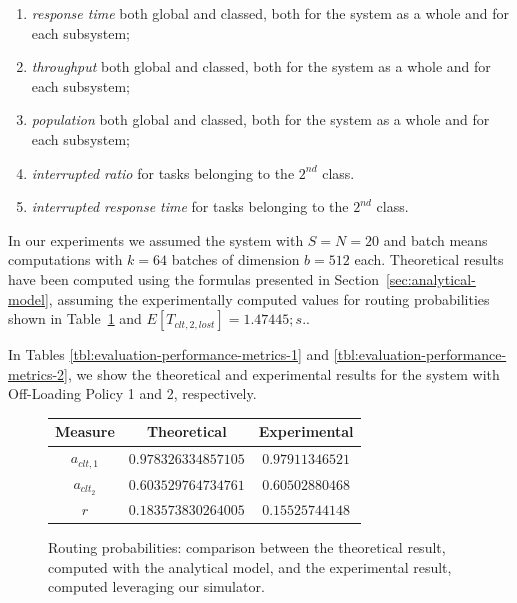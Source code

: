 \begin{enumerate}
	\item \textit{response time} both global and classed, both for the system as a whole and for each subsystem;
	
	\item \textit{throughput} both global and classed, both for the system as a whole and for each subsystem;
	
	\item \textit{population} both global and classed, both for the system as a whole and for each subsystem;
	
	\item \textit{interrupted ratio} for tasks belonging to the $2^{nd}$ class.
	
	\item \textit{interrupted response time} for tasks belonging to the $2^{nd}$ class.
\end{enumerate}

In our experiments we assumed the system with $S=N=20$ and batch means computations with $k=64$ batches of dimension $b=512$ each.
%
Theoretical results have been computed using the formulas presented in Section~\ref{sec:analytical-model}, assuming the experimentally computed values for routing probabilities shown in Table~\ref{tbl:evaluation-routing-probabilities} and $E[T_{clt,2,lost}]=1.47445;s.$.

In Tables \ref{tbl:evaluation-performance-metrics-1} and \ref{tbl:evaluation-performance-metrics-2}, we show the theoretical and experimental results for the system with Off-Loading Policy 1 and 2, respectively.

\begin{figure}
	\begin{center}
		\begin{tabular}{|c||c|c|}
			\hline
			Measure & Theoretical & Experimental\\
			\hline
			$a_{clt,1}$  & $0.978326334857105$ & $0.97911346521$ \\
			$a_{clt_2}$  & $0.603529764734761$ & $0.60502880468$ \\
			$r$          & $0.183573830264005$ & $0.15525744148$ \\	
			\hline
		\end{tabular}
	\end{center}
	\caption{Routing probabilities: comparison between the theoretical result, computed with the analytical model, and the experimental result, computed leveraging our simulator.}
	\label{tbl:evaluation-routing-probabilities}
\end{figure}

